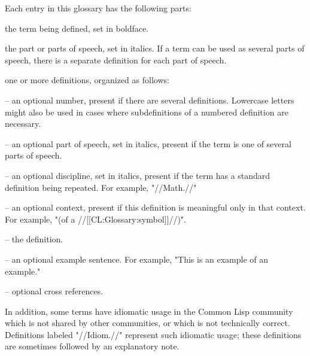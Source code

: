 \def\gentry#1{\itemitem{}\b{#1}\idxterm{#1}}
\def\gexample#1{{"#1"}}
\def\indextab#1{\endlist\indextabnote{#1}\beginlist}
\def\firstindextab#1{\indextabnote{#1}\beginlist}
\def\indextabnote#1{\goodbreak\item{\b{#1}}\penalty20000}
 
 
Each entry in this glossary has the following parts:
 
\beginlist
 
\item{\bull} the term being defined, set in boldface.
 
 \item{\bull} the part or parts of speech, set in italics. If a term
can be used as several parts of speech, there is a separate definition
for each part of speech.
 
 \item{\bull} one or more definitions, organized as follows:
 
\beginlist
 
 \item{--} an optional number, present if there are several
definitions. Lowercase letters might also be used in cases where subdefinitions of
a numbered definition are necessary.
 
 \item{--} an optional part of speech, set in italics, present if the
term is one of several parts of speech.
 
 \item{--} an optional discipline, set in italics, present if the term
has a standard definition being repeated. For example, "//Math.//"
 
 \item{--} an optional context, present if this definition is
meaningful only in that context. For example, "(of a //[[CL:Glossary:symbol]]//)".
 
 \item{--} the definition.
 
 \item{--} an optional example sentence. For example, \gexample{This is an example of an example.}
 
 \item{--} optional cross references.
 
\endlist
\endlist
 
In addition, some terms have idiomatic usage in the Common Lisp
community which is not shared by other communities, or which is not
technically correct. Definitions labeled "//Idiom.//" represent
such idiomatic usage; these definitions are sometimes followed by an
explanatory note.
 
